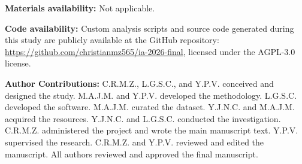 \documentclass[pdflatex,sn-basic,Numbered,iicol]{sn-jnl}
\begin{document}
\noindent\textbf{Materials availability:} Not applicable.

\noindent\textbf{Code availability:} Custom analysis scripts and source code generated during this study are publicly available at the GitHub repository: \url{https://github.com/christianmz565/ia-2026-final}, licensed under the AGPL-3.0 license.

\noindent\textbf{Author Contributions:} C.R.M.Z., L.G.S.C., and Y.P.V. conceived and designed the study. M.A.J.M. and Y.P.V. developed the methodology. L.G.S.C. developed the software. M.A.J.M. curated the dataset. Y.J.N.C. and M.A.J.M. acquired the resources. Y.J.N.C. and L.G.S.C. conducted the investigation. C.R.M.Z. administered the project and wrote the main manuscript text. Y.P.V. supervised the research. C.R.M.Z. and Y.P.V. reviewed and edited the manuscript. All authors reviewed and approved the final manuscript.



\end{document}
